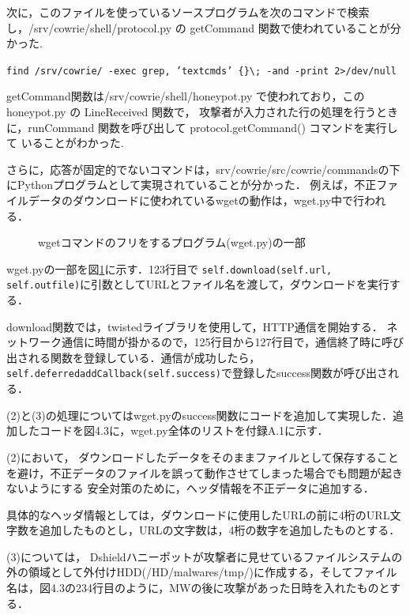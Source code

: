 \documentclass[dvipdfmx]{bta}
\begin{document}
次に，このファイルを使っているソースプログラムを次のコマンドで検索し，/srv/cowrie/shell/protocol.py の
getCommand 関数で使われていることが分かった.

\verb!find /srv/cowrie/ -exec grep, ’textcmds’ {}\; -and -print 2>/dev/null!

getCommand関数は/srv/cowrie/shell/honeypot.py で使われており，この honeypot.py の LineReceived 関数で， 攻撃者が入力された行の処理を行うときに，runCommand 関数を呼び出して protocol.getCommand() コマンドを実行して いることがわかった.

さらに，応答が固定的でないコマンドは，srv/cowrie/src/cowrie/commandsの下にPythonプログラムとして実現されていることが分かった．
例えば，不正ファイルデータのダウンロードに使われているwgetの動作は，wget.py中で行われる．

\begin{figure}[htbp]


\caption{wgetコマンドのフリをするプログラム(wget.py)の一部}\label{fig:downloader}

\end{figure}

wget.pyの一部を図\ref{fig:downloader}に示す．123行目で
\verb!self.download(self.url, self.outfile)!に引数としてURLとファイル名を渡して，ダウンロードを実行する．

download関数では，twistedライブラリ\cite{Twisted}を使用して，HTTP通信を開始する．
ネットワーク通信に時間が掛かるので，125行目から127行目で，通信終了時に呼び出される関数を登録している．通信が成功したら，\verb!self.deferredaddCallback(self.success)!で登録したsuccess関数が呼び出される．

(2)と(3)の処理についてはwget.pyのsuccess関数にコードを追加して実現した．追加したコードを図4.3に，wget.py全体のリストを付録A.1に示す．



(2)において，
ダウンロードしたデータをそのままファイルとして保存することを避け，不正データのファイルを誤って動作させてしまった場合でも問題が起きないようにする
安全対策のために，ヘッダ情報を不正データに追加する．

具体的なヘッダ情報としては，ダウンロードに使用したURLの前に4桁のURL文字数を追加したものとし，URLの文字数は，4桁の数字を追加したものとする．

(3)については，
Dshieldハニーポットが攻撃者に見せているファイルシステムの外の領域として外付けHDD(/HD/malwares/tmp/)に作成する，そしてファイル名は，図4.3の234行目のように，MWの後に攻撃があった日時を入れたものとする．
\end{document}

